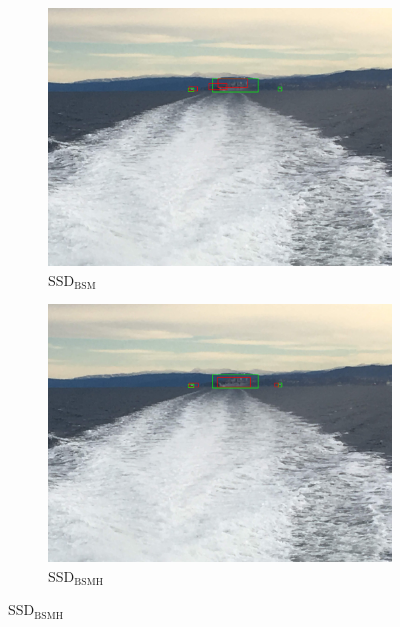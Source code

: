 \begin{figure}[h!]
\begin{subfigure}{.5\textwidth}
  \centering
  \includegraphics[width=0.8\linewidth]{results/case_buildings/ssdtrf/ssd2/3better/IMG_2350.jpg}
  \caption{SSD$_{\text{BSM}}$}
\end{subfigure}%
\begin{subfigure}{.5\textwidth}
  \centering
  \includegraphics[width=.8\linewidth]{results/case_buildings/ssdtrf/ssd3/3better/IMG_2350.jpg}
  \caption{SSD$_{\text{BSMH}}$}
\end{subfigure}


\end{figure}
